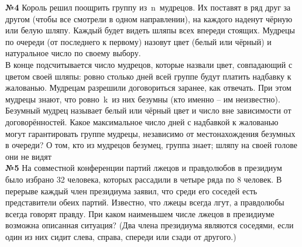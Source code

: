 \documentclass[12 pt, a4paper]{article}%
\newcommand{\task}[1]{{{\vspace{0.6cm} \vspace{-2ex} \textbf{№{#1}}  }}}
\begin{document}
	\task{4} Король решил поощрить группу из n мудрецов. Их поставят в ряд друг за другом (чтобы все смотрели в одном направлении), на каждого наденут чёрную или белую шляпу. Каждый будет видеть шляпы всех впереди стоящих. Мудрецы по очереди (от последнего к первому) назовут цвет (белый или чёрный) и натуральное число по своему выбору.\\
	\newpage
	В конце подсчитывается число мудрецов, которые назвали цвет, совпадающий с цветом своей шляпы: ровно столько дней всей группе будут платить надбавку к жалованью. Мудрецам разрешили договориться заранее, как отвечать. При этом мудрецы знают, что ровно k из них безумны (кто именно – им неизвестно). Безумный мудрец называет белый или чёрный цвет и число вне зависимости от договорённостей. Какое максимальное число дней с надбавкой к жалованью могут гарантировать группе мудрецы, независимо от местонахождения безумных в очереди?
	О том, кто из мудрецов безумец, группа знает; шляпу на своей голове они не видят\\
	\task{5} На совместной конференции партий лжецов и правдолюбов в президиум было избрано 32 человека, которых рассадили в четыре ряда по 8 человек. В перерыве каждый член президиума заявил, что среди его соседей есть представители обеих партий. Известно, что лжецы всегда лгут, а правдолюбы всегда говорят правду. При каком наименьшем числе лжецов в президиуме возможна описанная ситуация? (Два члена президиума являются соседями, если один из них сидит слева, справа, спереди или сзади от другого.)\\

	
\end{document}
